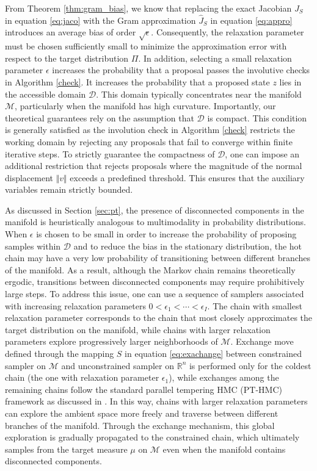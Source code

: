 \documentclass[12pt]{article}
\begin{document}
From Theorem \ref{thm:gram_bias}, we know that replacing the exact Jacobian $J_S$ in equation \eqref{eq:jaco} with the Gram approximation $\widehat{J}_S$ in equation \eqref{eq:appro} introduces an average bias of order $\sqrt{\epsilon}$. Consequently, the relaxation parameter must be chosen sufficiently small to minimize the approximation error with respect to the target distribution $\Pi$. In addition, selecting a small relaxation parameter $\epsilon$ increases the probability that a proposal passes the involutive checks in Algorithm \ref{check}. It increases the probability that a proposed state $z$ lies in the accessible domain $\mathcal{D}$. This domain typically concentrates near the manifold $\mathcal{M}$, particularly when the manifold has high curvature. Importantly, our theoretical guarantees rely on the assumption that $\mathcal{D}$ is compact. This condition is generally satisfied as the involution check in Algorithm \ref{check} restricts the working domain by rejecting any proposals that fail to converge within finite iterative steps. To strictly guarantee the compactness of $\mathcal{D}$, one can impose an additional restriction that rejects proposals where the magnitude of the normal displacement $\Vert v \Vert$ exceeds a predefined threshold. This ensures that the auxiliary variables remain strictly bounded.

As discussed in Section \ref{sec:pt}, the presence of disconnected components in the manifold is heuristically analogous to multimodality in probability distributions. When $\epsilon$ is chosen to be small in order to increase the probability of proposing samples within $\mathcal{D}$ and to reduce the bias in the stationary distribution, the hot chain may have a very low probability of transitioning between different branches of the manifold. As a result, although the Markov chain remains theoretically ergodic, transitions between disconnected components may require prohibitively large steps.
To address this issue, one can use a sequence of samplers associated with increasing relaxation parameters $0<\epsilon_1<\cdots<\epsilon_I$. The chain with smallest relaxation parameter corresponds to the chain that most closely approximates the target distribution on the manifold, while chains with larger relaxation parameters explore progressively larger neighborhoods of $\mathcal{M}$. Exchange move defined through the mapping $S$ in equation \eqref{eq:exachange} between constrained sampler on $\mathcal{M}$ and unconstrained sampler on $\mathbb R^n$ is performed only for the coldest chain (the one with relaxation parameter $\epsilon_1$), while exchanges among the remaining chains follow the standard parallel tempering HMC (PT-HMC) framework as discussed in \citep{J15, J23, j24}.
In this way, chains with larger relaxation parameters can explore the ambient space more freely and traverse between different branches of the manifold. Through the exchange mechanism, this global exploration is gradually propagated to the constrained chain, which ultimately samples from the target measure $\mu$ on $\mathcal{M}$ even when the manifold contains disconnected components.
\end{document}
